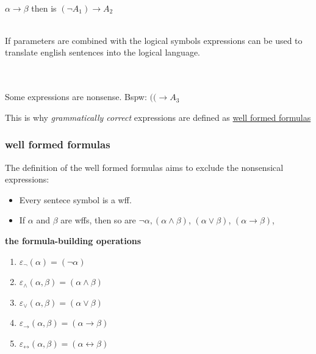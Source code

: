 \documentclass[12pt, letterpaper]{article}
\begin{document}
\\ $\alpha \rightarrow \beta$ then is  $(\neg A_{1}) \rightarrow A_{2}$ 

\\
If parameters are combined with the logical symbols expressions can be used to translate english sentences into the logical language.

\\\\Some expressions are nonsense. Bspw: $((\rightarrow A_{3}$

This is why \textit{grammatically correct}	expressions are defined as \hyperref[sec:well formed formulas]{well formed formulas}
\subsubsection{well formed formulas}

\label{sec:well formed formulas}
The definition of the well formed formulas aims to exclude the nonsensical expressions:\\
\begin{itemize}
	\item Every sentece symbol is a wff.
	\item If $\alpha$ and $\beta$ are wffs, then so are $\neg \alpha, (\alpha \land \beta)$, $(\alpha \lor \beta)$, $(\alpha \rightarrow \beta)$, 
\end{itemize}
\textbf{the formula-building operations}
\begin{enumerate}
	
	\item $\varepsilon_{\neg}(\alpha) = (\neg \alpha)$
	\item $\varepsilon_{\land }(\alpha, \beta) = (\alpha \land \beta)$
	\item $\varepsilon_{\lor }(\alpha, \beta)= (\alpha \lor \beta)$
	\item $\varepsilon_{\rightarrow }(\alpha, \beta) = (\alpha \rightarrow  \beta)$
	\item $\varepsilon_{\leftrightarrow }(\alpha, \beta) = (\alpha \leftrightarrow  \beta)$


\end{enumerate}

\newpage
\end{document}
